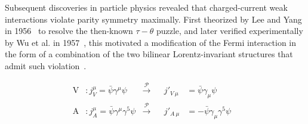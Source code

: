 Subsequent discoveries in particle physics revealed that charged-current weak interactions violate parity symmetry maximally. First theorized by Lee and Yang in 1956~\cite{Lee:1956qn} to resolve the then-known $\tau - \theta$ puzzle, and later verified experimentally by Wu et al. in 1957~\cite{Wu:1957my}, this motivated a modification of the Fermi interaction in the form of a combination of the two bilinear Lorentz-invariant structures that admit such violation~\cite{Sudarshan:1958vf, Feynman:1958ty}.

\begin{align}
\text{V}&: j_{V}^{\mu} = \bar{\psi}\gamma^\mu\psi &\xrightarrow{\mathcal{P}}& &j'_{V~\mu} &= \bar{\psi}\gamma_\mu\psi& \label{eq:V}\\
\text{A}&: j_{A}^{\mu} = \bar{\psi}\gamma^\mu\gamma^5\psi &\xrightarrow{\mathcal{P}}& &j'_{A~\mu} &= -\bar{\psi}\gamma_\mu\gamma^5\psi& \label{eq:A}
\end{align}

